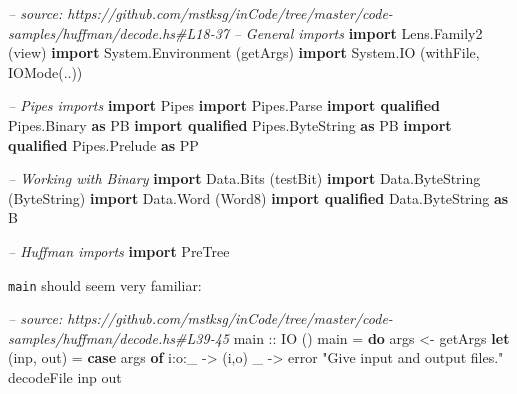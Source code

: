 \documentclass[]{article}
\newenvironment{Shaded}{}{}
\newcommand{\KeywordTok}[1]{\textcolor[rgb]{0.00,0.44,0.13}{\textbf{{#1}}}}
\newcommand{\DataTypeTok}[1]{\textcolor[rgb]{0.56,0.13,0.00}{{#1}}}
\newcommand{\StringTok}[1]{\textcolor[rgb]{0.25,0.44,0.63}{{#1}}}
\newcommand{\CommentTok}[1]{\textcolor[rgb]{0.38,0.63,0.69}{\textit{{#1}}}}
\newcommand{\OtherTok}[1]{\textcolor[rgb]{0.00,0.44,0.13}{{#1}}}
\newcommand{\FunctionTok}[1]{\textcolor[rgb]{0.02,0.16,0.49}{{#1}}}
\newcommand{\NormalTok}[1]{{#1}}
\begin{document}
\begin{Shaded}
\begin{Highlighting}[]
\CommentTok{-- source: https://github.com/mstksg/inCode/tree/master/code-samples/huffman/decode.hs#L18-37}
\CommentTok{-- General imports}
\KeywordTok{import }\DataTypeTok{Lens.Family2}       \NormalTok{(view)}
\KeywordTok{import }\DataTypeTok{System.Environment} \NormalTok{(getArgs)}
\KeywordTok{import }\DataTypeTok{System.IO}          \NormalTok{(withFile, }\DataTypeTok{IOMode}\NormalTok{(..))}

\CommentTok{-- Pipes imports}
\KeywordTok{import }\DataTypeTok{Pipes}
\KeywordTok{import }\DataTypeTok{Pipes.Parse}
\KeywordTok{import qualified} \DataTypeTok{Pipes.Binary}     \KeywordTok{as} \DataTypeTok{PB}
\KeywordTok{import qualified} \DataTypeTok{Pipes.ByteString} \KeywordTok{as} \DataTypeTok{PB}
\KeywordTok{import qualified} \DataTypeTok{Pipes.Prelude}    \KeywordTok{as} \DataTypeTok{PP}

\CommentTok{-- Working with Binary}
\KeywordTok{import }\DataTypeTok{Data.Bits}                 \NormalTok{(testBit)}
\KeywordTok{import }\DataTypeTok{Data.ByteString}           \NormalTok{(}\DataTypeTok{ByteString}\NormalTok{)}
\KeywordTok{import }\DataTypeTok{Data.Word}                 \NormalTok{(}\DataTypeTok{Word8}\NormalTok{)}
\KeywordTok{import qualified} \DataTypeTok{Data.ByteString} \KeywordTok{as} \DataTypeTok{B}

\CommentTok{-- Huffman imports}
\KeywordTok{import }\DataTypeTok{PreTree}
\end{Highlighting}
\end{Shaded}

\texttt{main} should seem very familiar:

\begin{Shaded}
\begin{Highlighting}[]
\CommentTok{-- source: https://github.com/mstksg/inCode/tree/master/code-samples/huffman/decode.hs#L39-45}
\OtherTok{main ::} \DataTypeTok{IO} \NormalTok{()}
\NormalTok{main }\FunctionTok{=} \KeywordTok{do}
    \NormalTok{args     }\OtherTok{<-} \NormalTok{getArgs}
    \KeywordTok{let} \NormalTok{(inp, out)  }\FunctionTok{=} \KeywordTok{case} \NormalTok{args }\KeywordTok{of}
                        \NormalTok{i}\FunctionTok{:}\NormalTok{o}\FunctionTok{:}\NormalTok{_      }\OtherTok{->} \NormalTok{(i,o)}
                        \NormalTok{_          }\OtherTok{->} \NormalTok{error }\StringTok{"Give input and output files."}
    \NormalTok{decodeFile inp out}
\end{Highlighting}
\end{Shaded}
\end{document}
